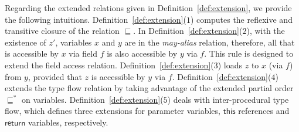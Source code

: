 \documentclass{fac}
\newcommand\ie{\textit{i.e.\ }}
\newcommand{\keyword}[1]{\mathsf{#1}}
\newcommand{\less}{\sqsubseteq}
\newcommand{\tflow}{\dashrightarrow}
\begin{document}
Regarding the extended relations given in Definition~\ref{def:extension}, we provide the following intuitions. Definition~\ref{def:extension}($1$)  computes the reflexive and transitive closure of the relation $\less$.
In Definition~\ref{def:extension}($2$), with the existence of $z'$, variables $x$ and $y$ are in the \emph{may-alias} relation, therefore, all that is accessible by $x$ via field $f$ is also accessible by $y$ via $f$. This rule is designed to extend the field access relation.
Definition~\ref{def:extension}($3$) loads $z$ to $x$ (via $f$) from $y$, provided that $z$ is accessible by $y$ via $f$.
Definition~\ref{def:extension}($4$) extends the type flow relation by taking advantage of the extended partial order $\less^*$ on variables.
Definition~\ref{def:extension}($5$) deals with inter-procedural type flow, which defines three extensions for parameter variables, $\keyword{this}$ references and $\keyword{return}$ variables, respectively.

\end{document}
